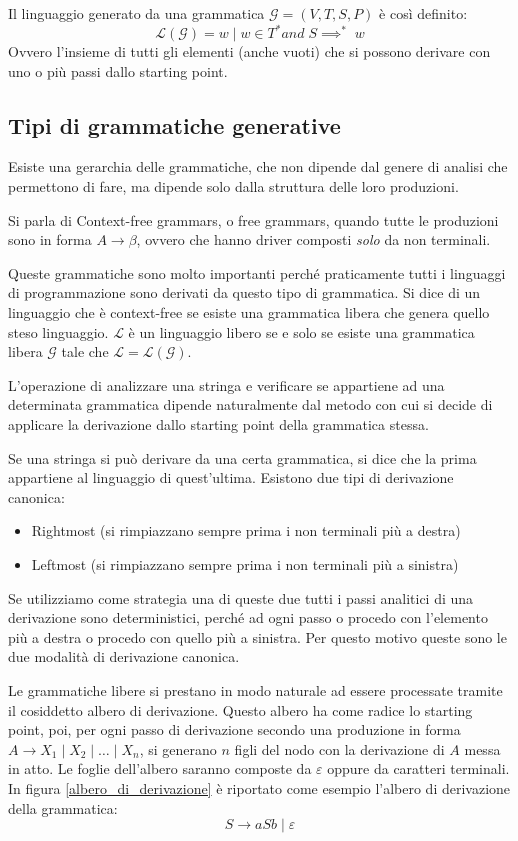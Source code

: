 \documentclass[class=book, crop=false, oneside, 12pt]{standalone}
\begin{document}
Il linguaggio generato da una grammatica \(\mathcal{G} = (V,T,S,P)\) è così definito:
\begin{equation}
    \mathcal{L}(\mathcal{G}) = {w \mid w \in T^* and \; S \implies^* \; w }
\end{equation}
Ovvero l'insieme di tutti gli elementi (anche vuoti) che si possono derivare con uno o più passi dallo starting point.

\subsection{Tipi di grammatiche generative}
Esiste una gerarchia delle grammatiche, che non dipende dal genere di analisi che permettono di fare, ma dipende solo dalla struttura delle loro produzioni.

Si parla di Context-free grammars, o free grammars, quando tutte le produzioni sono in forma \(A \to \beta\), ovvero che hanno driver composti \emph{solo} da non terminali.

Queste grammatiche sono molto importanti perché praticamente tutti i linguaggi di programmazione sono derivati da questo tipo di grammatica.
Si dice di un linguaggio che è context-free se esiste una grammatica libera che genera quello steso linguaggio.
\(\mathcal{L}\) è un linguaggio libero se e solo se esiste una grammatica libera \(\mathcal{G}\) tale che \(\mathcal{L}=\mathcal{L}(\mathcal{G})\).

L’operazione di analizzare una stringa e verificare se appartiene ad una determinata grammatica dipende naturalmente dal metodo con cui si decide di applicare la derivazione dallo starting point della grammatica stessa.

Se una stringa si può derivare da una certa grammatica, si dice che la prima appartiene al linguaggio di quest'ultima.
Esistono due tipi di derivazione canonica:
\begin{itemize}
    \item Rightmost (si rimpiazzano sempre prima i non terminali più a destra)
    \item Leftmost (si rimpiazzano sempre prima i non terminali più a sinistra)
\end{itemize}
Se utilizziamo come strategia una di queste due tutti i passi analitici di una derivazione sono deterministici, perché ad ogni passo o procedo con l’elemento più a destra o procedo con quello più a sinistra. Per questo motivo queste sono le due modalità di derivazione canonica.

Le grammatiche libere si prestano in modo naturale ad essere processate tramite il cosiddetto albero di derivazione.
Questo albero ha come radice lo starting point, poi, per ogni passo di derivazione secondo una produzione in forma \(A \to X_1 \mid X_2 \mid\dots\mid X_n \), si generano \(n\) figli del nodo con la derivazione di \(A\) messa in atto.
Le foglie dell’albero saranno composte da \(\varepsilon\) oppure da caratteri terminali. In figura \ref{albero_di_derivazione} è riportato come esempio l'albero di derivazione della grammatica:
\begin{equation}
    S \to aSb \mid \varepsilon
    \label{grammatica_allbero}
\end{equation}
\end{document}
